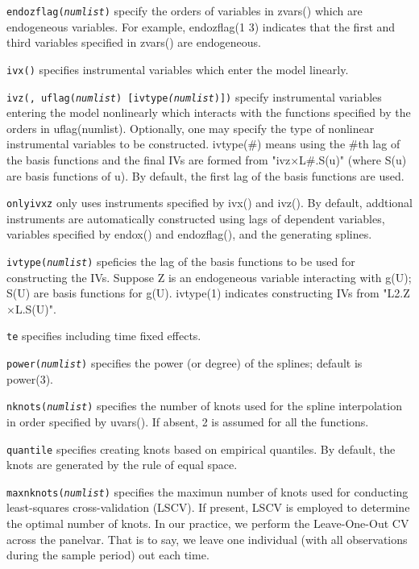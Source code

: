 \hangpara
{\tt endozflag(\textit{numlist})} specify the orders of variables in zvars(\varlist) which are endogeneous variables. For example,
endozflag(1 3) indicates that the first and third variables specified in zvars(\varlist) are endogeneous.


\hangpara
{\tt ivx(\varlist)} specifies instrumental variables which enter the model linearly.

\hangpara
{\tt ivz(\varlist, uflag(\textit{numlist}) [ivtype\textit{(numlist})])} specify instrumental variables entering the model nonlinearly which
interacts with the functions specified by the orders in uflag(numlist).  Optionally, one may specify the type of
nonlinear instrumental variables to be constructed. ivtype(\#) means using the \#th lag of the basis functions and the
final IVs are formed from "ivz$\times$L\#.S(u)" (where S(u) are basis functions of u). By default, the first lag of the basis functions are used.

\hangpara
{\tt onlyivxz} only uses instruments specified by ivx() and ivz(). By default, addtional instruments are
automatically constructed using lags of dependent variables, variables specified by endox() and endozflag(), and
the generating splines.


\hangpara
{\tt ivtype(\textit{numlist})}  speficies the lag of the basis functions to be used for constructing the IVs.  Suppose Z is an
endogeneous variable interacting with g(U); S(U) are basis functions for g(U). ivtype(1) indicates constructing IVs
from "L2.Z$\times$L.S(U)".

\hangpara
{\tt te} specifies including time fixed effects.


\hangpara
{\tt power(\textit{numlist})} specifies the power (or degree) of the splines; default is power(3).

\hangpara
{\tt nknots(\textit{numlist})} specifies the number of knots used for the spline interpolation in order specified by uvars().  If
absent, 2 is assumed for all the functions.

\hangpara
{\tt quantile} specifies creating knots based on empirical quantiles. By default, the knots are generated by the rule of
equal space.

\hangpara
{\tt maxnknots(\textit{numlist})} specifies the maximun number of knots used for conducting least-squares cross-validation (LSCV). If present, LSCV is employed to
determine the optimal number of knots. In our practice, we perform the Leave-One-Out CV across the panelvar. That
is to say, we leave one individual (with all observations during the sample period) out each time.


